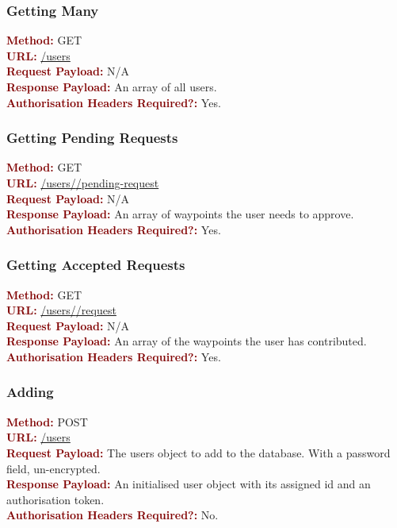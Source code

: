 \documentclass[11pt,a4paper]{report}
\begin{document}
\subsubsection{Getting Many}
\textbf{\textcolor{Maroon}{Method:}} GET\\
\textbf{\textcolor{Maroon}{URL:}} \url{/users}\\
\textbf{\textcolor{Maroon}{Request Payload:}} N/A\\
\textbf{\textcolor{Maroon}{Response Payload:}} An array of all users.\\
\textbf{\textcolor{Maroon}{Authorisation Headers Required?:}} Yes.

\subsubsection{Getting Pending Requests}
\textbf{\textcolor{Maroon}{Method:}} GET\\
\textbf{\textcolor{Maroon}{URL:}} \url{/users/}\url{/pending-request}\\
\textbf{\textcolor{Maroon}{Request Payload:}} N/A\\
\textbf{\textcolor{Maroon}{Response Payload:}} An array of waypoints the user needs to approve.\\
\textbf{\textcolor{Maroon}{Authorisation Headers Required?:}} Yes.

\subsubsection{Getting Accepted Requests}
\textbf{\textcolor{Maroon}{Method:}} GET\\
\textbf{\textcolor{Maroon}{URL:}} \url{/users/}\url{/request}\\
\textbf{\textcolor{Maroon}{Request Payload:}} N/A\\
\textbf{\textcolor{Maroon}{Response Payload:}} An array of the waypoints the user has contributed.\\
\textbf{\textcolor{Maroon}{Authorisation Headers Required?:}} Yes.

\subsubsection{Adding}
\textbf{\textcolor{Maroon}{Method:}} POST\\
\textbf{\textcolor{Maroon}{URL:}} \url{/users}\\
\textbf{\textcolor{Maroon}{Request Payload:}} The users object to add to the database. With a password field, un-encrypted.\\
\textbf{\textcolor{Maroon}{Response Payload:}} An initialised user object with its assigned id and an authorisation token.\\
\textbf{\textcolor{Maroon}{Authorisation Headers Required?:}} No.
\end{document}
